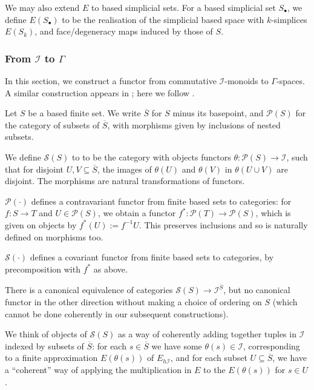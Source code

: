 \documentclass{TPmod}
\newcommand{\cI}{\mathcal{I}}
\newcommand{\cP}{\mathcal{P}}
\newcommand{\cS}{\mathcal{S}}
\numberwithin{equation}{section}
\begin{document}
    We may also extend $E$ to based simplicial sets. For a based simplicial set $S_\bullet$, we define $E(S_\bullet)$ to be the realisation of the simplicial based space with $k$-simplices $E(S_k)$, and face/degeneracy maps induced by those of $S$.
\subsubsection{From $\cI$ to $\Gamma$}\label{sec: cI Gam}
    In this section, we construct a functor from commutative $\cI$-monoids to $\Gamma$-spaces. A similar construction appears in \cite[Section 2]{Segal}; here we follow \cite[Section 5.2]{Schlichtkrull}.

    \begin{defn}
        Let $S$ be a based finite set. We write $\overline S$ for $S$ minus its basepoint, and $\cP(S)$ for the category of subsets of $\overline S$, with morphisms given by inclusions of nested subsets.

        We define $\cS(S)$ to to be the category with objects functors $\theta: \cP(S) \to \cI$, such that for disjoint $U, V \subseteq \overline S$, the images of $\theta(U)$ and $\theta(V)$ in $\theta(U \cup V)$ are disjoint. The morphisms are natural transformations of functors.
    \end{defn}
    \begin{rmk}
        $\cP(\cdot)$ defines a contravariant functor from finite based sets to categories: for $f: S \to T$ and $U \in \cP(S)$, we obtain a functor $f^*: \cP(T) \to \cP(S)$, which is given on objects by $f^*(U) := f^{-1}U$. This preserves inclusions and so is naturally defined on morphisms too.

        $\cS(\cdot)$ defines a covariant functor from finite based sets to categories, by precomposition with $f^*$ as above.
    \end{rmk}
    \begin{rmk}
        There is a canonical equivalence of categories $\cS(S) \to \cI^{\overline S}$, but no canonical functor in the other direction without making a choice of ordering on $S$ (which cannot be done coherently in our subsequent constructions).
    \end{rmk}
    \begin{rmk}
        We think of objects of $\cS(S)$ as a way of coherently adding together tuples in $\cI$ indexed by subsets of $\overline S$: for each $s \in \overline S$ we have some $\theta(s) \in \cI$, corresponding to a finite approximation $E(\theta(s))$ of $E_{h\cI}$, and for each subset $U \subseteq \overline S$, we have a ``coherent'' way of applying the multiplication in $E$ to the $E(\theta(s))$ for $s \in U$. 
    \end{rmk}
\end{document}
